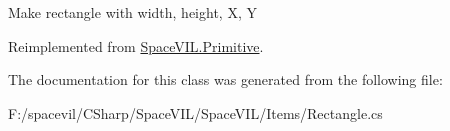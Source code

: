 Make rectangle with width, height, X, Y 



Reimplemented from \mbox{\hyperlink{class_space_v_i_l_1_1_primitive_a4e7ed3f8d9e28e0063c36f4f2bf470cd}{Space\+V\+I\+L.\+Primitive}}.



The documentation for this class was generated from the following file\+:\begin{DoxyCompactItemize}
\item 
F\+:/spacevil/\+C\+Sharp/\+Space\+V\+I\+L/\+Space\+V\+I\+L/\+Items/Rectangle.\+cs\end{DoxyCompactItemize}
